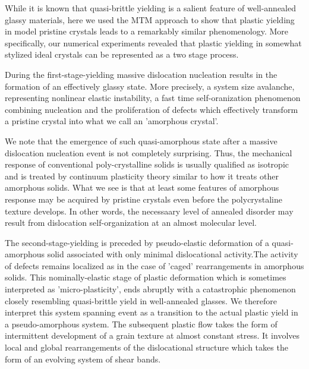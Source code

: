 \documentclass[aps,
superscriptaddress,notitlepage]{revtex4-1}
\begin{document}
 While it is known that quasi-brittle yielding is  a salient feature  of well-annealed glassy materials,  here we used  the  MTM approach to show that plastic yielding in model pristine crystals leads to a remarkably similar phenomenology. More specifically, our numerical experiments  revealed that plastic yielding in  somewhat  stylized ideal crystals can be represented as a two stage process. 
 
 During the first-stage-yielding massive dislocation nucleation results  in the formation of an effectively  glassy state. More precisely,  a  system size avalanche, representing  nonlinear elastic instability,  a fast time  self-oranization phenomenon  combining nucleation and   the proliferation of defects  which  effectively transform  a pristine crystal into what we call an 'amorphous crystal'.
 
We note that the emergence of such quasi-amorphous state  after a massive dislocation nucleation event is not completely surprising. Thus,  the  mechanical response of conventional poly-crystalline solids is usually qualified as isotropic and  is treated by continuum plasticity theory similar to how it treats  other amorphous solids. What we see  is that  at least some features of amorphous response may be acquired by  pristine crystals even before the polycrystaline texture develops. In other words, the necessaary level of annealed  disorder may  result from  dislocation  self-organization at   an  almost molecular level.  

The second-stage-yielding  is preceded by pseudo-elastic deformation of  a quasi-amorphous solid  associated with only minimal dislocational activity.The activity of defects  remains  localized as in the case of 'caged' rearrangements  in  amorphous solids.  This  nominally-elastic stage of plastic deformation  which is sometimes interpreted as 'micro-plasticity', ends abruptly with  a catastrophic  phenomenon closely resembling   quasi-brittle yield in well-annealed glasses.  We therefore interpret this  system spanning event  as a transition to the actual plastic yield in a pseudo-amorphous system.  The subsequent  plastic flow takes the form of intermittent development of  a grain texture  at  almost constant stress. It  involves local and global rearrangements of the dislocational structure which takes the form  of an evolving  system of  shear bands. 
 
\end{document}
